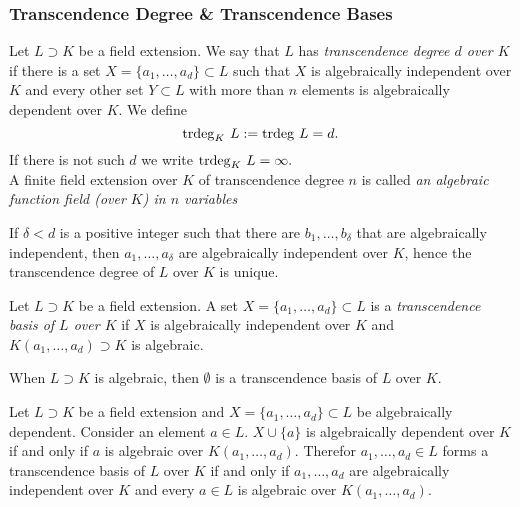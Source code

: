 \subsubsection{Transcendence Degree \& Transcendence Bases}
\begin{definition}
    Let $L\supset K$ be a field extension. We say that $L$ has \textit{transcendence degree $d$ over $K$} if there is a set $X=\{ a_1,\dots,a_d\}\subset L$ such that $X$ is algebraically independent over $K$ and every other set $Y\subset L$ with more than $n$ elements is algebraically dependent over $K$. We define 
    $$\mathrm{trdeg }_K\ L:=\mathrm{trdeg } \ L =d.$$
    If there is not such $d$ we write $\mathrm{trdeg }_K \ L = \infty.$\\
    A finite field extension over $K$ of transcendence degree $n$ is called \textit{an algebraic function field (over $K$) in $n$ variables} 
\end{definition}
\begin{remark}
    If $\delta<d$ is a positive integer such that there are $b_1,\dots,b_\delta$ that are algebraically independent, then $a_1,\dots,a_{\delta}$ are algebraically independent over $K$, hence the transcendence degree of $L$ over $K$ is unique. 
\end{remark}
\begin{definition}
    Let $L\supset K$ be a field extension. A set $X = \{a_1,\dots,a_d\}\subset L$ is a \textit{transcendence basis of $L$ over $K$} if $X$ is algebraically independent over $K$ and $K(a_1,\dots,a_d)\supset K$ is algebraic.  
\end{definition}
\begin{remark}
    When $L\supset K$ is algebraic, then $\emptyset$ is a transcendence basis of $L$ over $K$.
\end{remark}
\begin{lemma}\label{EquivalentDefinitionOfTranscendenceBasis}
    Let $L\supset K$ be a field extension and $X= \{a_1,\dots,a_d\}\subset L$ be algebraically dependent. Consider an element $a\in L$. $X\cup\{a\}$ is algebraically dependent over $K$ if and only if $a$ is algebraic over $K(a_1,\dots,a_d)$. Therefor $a_1,\dots,a_d\in L$ forms a transcendence basis of $L$ over $K$ if and only if $a_1,\dots,a_d$ are algebraically independent over $K$ and every $a\in L$ is algebraic over $K(a_1,\dots,a_d)$. 
\end{lemma}
